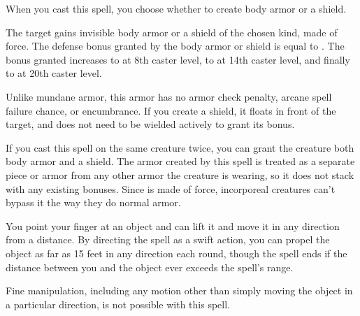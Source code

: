 \begin{comment}
\subsubsection{M}
\end{comment}

\begin{spellheader}
    \spellrng{\rngclose}
    \spellspecial When you cast this spell, you choose whether to create body armor or a shield.
\end{spellheader}
\begin{spelleffects}
    \spelleffect The target gains invisible body armor or a shield of the chosen kind, made of force. The defense bonus granted by the body armor or shield is equal to . The bonus granted increases to  at 8th caster level, to  at 14th caster level, and finally to  at 20th caster level. 
    \par Unlike mundane armor, this armor has no armor check penalty, arcane spell failure chance, or encumbrance. If you create a shield, it floats in front of the target, and does not need to be wielded actively to grant its bonus.
    \spellspecial 
\end{spelleffects}
\begin{spellfooter}
    \spellnotes If you cast this spell on the same creature twice, you can grant the creature both body armor and a shield. The armor created by this spell is treated as a separate piece or armor from any other armor the creature is wearing, so it does not stack with any existing bonuses. Since  is made of force, incorporeal creatures can't bypass it the way they do normal armor.
\end{spellfooter}

\begin{spellheader}
    \spellrng{\rngclose}
    \spelldur{\durshort}
\end{spellheader}
\begin{spelleffects}
    \spelleffect You point your finger at an object and can lift it and move it in any direction from a distance. By directing the spell as a swift action, you can propel the object as far as 15 feet in any direction each round, though the spell ends if the distance between you and the object ever exceeds the spell's range.
\end{spelleffects}
\begin{spellfooter}
    \spellnotes Fine manipulation, including any motion other than simply moving the object in a particular direction, is not possible with this spell.
\end{spellfooter}

